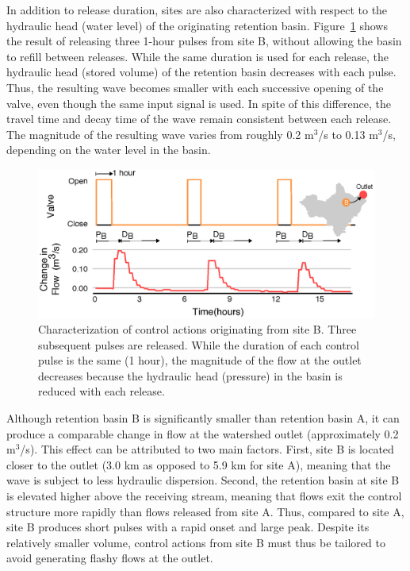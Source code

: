 In addition to release duration, sites are also characterized with respect to the hydraulic head (water level) of the originating retention basin. Figure~\ref{fig-ch2:4} shows the result of releasing three 1-hour pulses from site B, without allowing the basin to refill between releases. While the same duration is used for each release, the hydraulic head (stored volume) of the retention basin decreases with each pulse. Thus, the resulting wave becomes smaller with each successive opening of the valve, even though the same input signal is used. In spite of this difference, the travel time and decay time of the wave remain consistent between each release.
The magnitude of the resulting wave varies from roughly 0.2 m$^3$/s to 0.13 m$^3$/s, depending on the water level in the basin. 

\begin{figure}
    \centering
    \includegraphics[width=\textwidth]{gfx/Chapter-2/Figure5_F.eps}
    \caption{Characterization of control actions originating from site B. Three subsequent pulses are released. While the duration of each control pulse is the same (1 hour), the magnitude of the flow
    at the outlet decreases because the hydraulic head (pressure) in the basin is reduced with each release.
    }\label{fig-ch2:4}
\end{figure}

Although retention basin B is significantly smaller than retention basin A, it can produce a comparable change in flow at the watershed outlet (approximately 0.2 m$^3$/s). This effect can be attributed to two main factors. First, site B is located closer to the outlet (3.0 km as opposed to 5.9 km for site A), meaning that the wave is subject to less hydraulic dispersion. Second, the retention basin at site B is elevated higher above the receiving stream, meaning that flows exit the control structure more rapidly than flows released from site A. Thus, compared to site A, site B produces short pulses with a rapid onset and large peak. Despite its relatively smaller volume, control actions from site B must thus be tailored to avoid generating flashy flows at the outlet.

